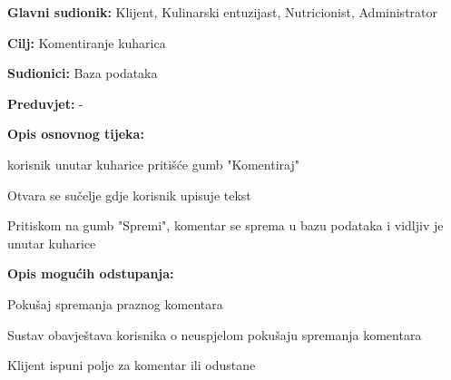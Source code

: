 			\noindent {}
					\begin{packed_item}
	
						\item \textbf{Glavni sudionik: }Klijent, Kulinarski entuzijast, Nutricionist, Administrator 
						\item  \textbf{Cilj:} Komentiranje kuharica
						\item  \textbf{Sudionici:} Baza podataka
						\item  \textbf{Preduvjet:} -
						\item  \textbf{Opis osnovnog tijeka:} 
						
						\item[] \begin{packed_enum}
	
							\item korisnik unutar kuharice pritišće gumb "Komentiraj"
							\item Otvara se sučelje gdje korisnik upisuje tekst
							\item Pritiskom na gumb "Spremi", komentar se sprema u bazu podataka i vidljiv je unutar kuharice
						\end{packed_enum}
						
						\item  \textbf{Opis mogućih odstupanja:}
						
						\item[] \begin{packed_item}
	
							\item[2.a] Pokušaj spremanja praznog komentara
							\item[] \begin{packed_enum}
								
								\item Sustav obavještava korisnika o neuspjelom pokušaju spremanja komentara 
								\item Klijent ispuni polje za komentar ili odustane
								
							\end{packed_enum}

						\end{packed_item}
					\end{packed_item}





